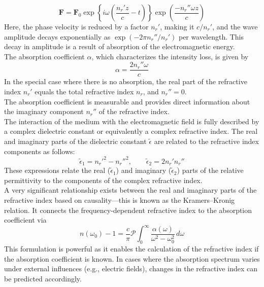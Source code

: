 \begin{equation}
	\mathbf{F} = \mathbf{F}_0 \exp\left\{ i\omega \left( \frac{n_r' z}{c} - t \right) \right\} \exp\left( \frac{-n_r'' \omega z}{c} \right)
\end{equation}
Here, the phase velocity is reduced by a factor \( n_r' \), making it \( c / n_r' \), and the wave amplitude decays exponentially as \( \exp(-2\pi n_r'' / n_r') \) per wavelength. This decay in amplitude is a result of absorption of the electromagnetic energy.\\
The absorption coefficient \( \alpha \), which characterizes the intensity loss, is given by
\begin{equation}
	\alpha = \frac{2 n_r'' \omega}{c}
\end{equation}
In the special case where there is no absorption, the real part of the refractive index \( n_r' \) equals the total refractive index \( n_r \), and \( n_r'' = 0 \).\\
The absorption coefficient is measurable and provides direct information about the imaginary component \( n_r'' \) of the refractive index.\\
The interaction of the medium with the electromagnetic field is fully described by a complex dielectric constant or equivalently a complex refractive index. The real and imaginary parts of the dielectric constant \( \tilde{\epsilon} \) are related to the refractive index components as follows:
\begin{equation}
	\tilde{\epsilon}_1 = n_r'^2 - n_r''^2, \qquad
	\tilde{\epsilon}_2 = 2 n_r' n_r''
\end{equation}
These expressions relate the real (\( \tilde{\epsilon}_1 \)) and imaginary (\( \tilde{\epsilon}_2 \)) parts of the relative permittivity to the components of the complex refractive index.\\
A very significant relationship exists between the real and imaginary parts of the refractive index based on causality—this is known as the Kramers–Kronig relation. It connects the frequency-dependent refractive index to the absorption coefficient via
\begin{equation}
	n(\omega_0) - 1 = \frac{c}{\pi} \mathcal{P} \int_0^\infty \frac{\alpha(\omega)}{\omega^2 - \omega_0^2} \, d\omega
\end{equation}
This formulation is powerful as it enables the calculation of the refractive index if the absorption coefficient is known. In cases where the absorption spectrum varies under external influences (e.g., electric fields), changes in the refractive index can be predicted accordingly.


